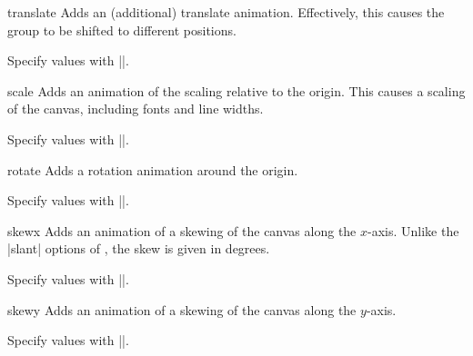 \begin{sysanimateattribute}{translate}
  Adds an (additional) translate animation. Effectively, this causes
  the group to be shifted to different positions.
  
  Specify values with |\pgfsys@animation@val@translate|. 
\begin{codeexample}[width=2cm]
\end{codeexample}
\end{sysanimateattribute}

\begin{sysanimateattribute}{scale}
  Adds an animation of the scaling relative to the origin. This causes
  a scaling of the canvas, including fonts and line widths.
  
  Specify values with |\pgfsys@animation@val@scale|.
\begin{codeexample}[width=2cm]
\end{codeexample}
\end{sysanimateattribute}

\begin{sysanimateattribute}{rotate}
  Adds a rotation animation around the origin.
  
  Specify values with |\pgfsys@animation@val@scalar|.
\begin{codeexample}[width=2cm]
\end{codeexample}
\end{sysanimateattribute}

\begin{sysanimateattribute}{skewx}
  Adds an animation of a skewing of the canvas along the
  $x$-axis. Unlike the |slant| options of \tikzname, the skew is given
  in degrees.
  
  Specify values with |\pgfsys@animation@val@scalar|.
\begin{codeexample}[width=2cm]
\end{codeexample}
\end{sysanimateattribute}

\begin{sysanimateattribute}{skewy}
  Adds an animation of a skewing of the canvas along the $y$-axis.
  
  Specify values with |\pgfsys@animation@val@scalar|.
\end{sysanimateattribute}

